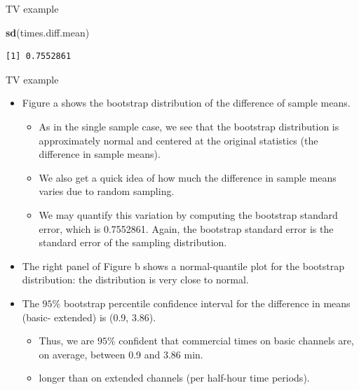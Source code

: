 \documentclass[
  ignorenonframetext,
]{beamer}
\newenvironment{Shaded}{\begin{snugshade}}{\end{snugshade}}
\newcommand{\FunctionTok}[1]{\textcolor[rgb]{0.13,0.29,0.53}{\textbf{#1}}}
\newcommand{\NormalTok}[1]{#1}
\providecommand{\tightlist}{%
  \setlength{\itemsep}{0pt}\setlength{\parskip}{0pt}}
\begin{document}
\begin{frame}[fragile]{TV example}
\begin{Shaded}
\begin{Highlighting}[]
\FunctionTok{sd}\NormalTok{(times.diff.mean)}
\end{Highlighting}
\end{Shaded}

\begin{verbatim}
[1] 0.7552861
\end{verbatim}

\normalsize
\end{frame}

\begin{frame}{TV example}
\protect\hypertarget{tv-example-5}{}
\begin{itemize}
\item
  Figure a shows the bootstrap distribution of the difference of sample
  means.

  \begin{itemize}
  \tightlist
  \item
    As in the single sample case, we see that the bootstrap distribution
    is approximately normal and centered at the original statistics (the
    difference in sample means).
  \item
    We also get a quick idea of how much the difference in sample means
    varies due to random sampling.
  \item
    We may quantify this variation by computing the bootstrap standard
    error, which is 0.7552861. Again, the bootstrap standard error is
    the standard error of the sampling distribution.
  \end{itemize}
\item
  The right panel of Figure b shows a normal-quantile plot for the
  bootstrap distribution: the distribution is very close to normal.
\item
  The \(95\%\) bootstrap percentile confidence interval for the
  difference in means (basic- extended) is (0.9, 3.86).

  \begin{itemize}
  \tightlist
  \item
    Thus, we are \(95\%\) confident that commercial times on basic
    channels are, on average, between 0.9 and 3.86 min.
  \item
    longer than on extended channels (per half-hour time periods).
  \end{itemize}
\end{itemize}
\end{frame}
\end{document}
